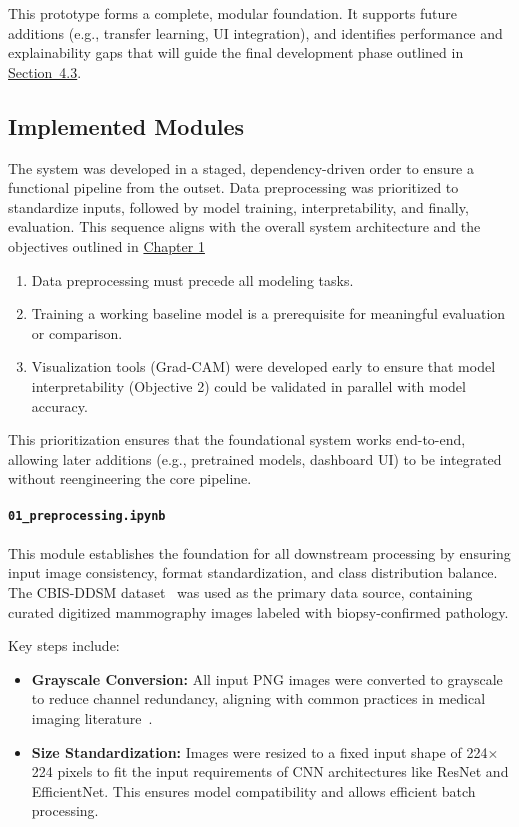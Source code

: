 \documentclass[12pt]{article}
\begin{document}
This prototype forms a complete, modular foundation. It supports future additions (e.g., transfer learning, UI integration), and identifies performance and explainability gaps that will guide the final development phase outlined in \hyperref[improvements]{Section~4.3}.

\subsection{Implemented Modules}
The system was developed in a staged, dependency-driven order to ensure a functional pipeline from the outset. Data preprocessing was prioritized to standardize inputs, followed by model training, interpretability, and finally, evaluation. This sequence aligns with the overall system architecture and the objectives outlined in \hyperref[chapter1]{Chapter 1}

\begin{enumerate}
    \item Data preprocessing must precede all modeling tasks.
    \item Training a working baseline model is a prerequisite for meaningful evaluation or comparison.
    \item Visualization tools (Grad-CAM) were developed early to ensure that model interpretability (Objective 2) could be validated in parallel with model accuracy.
\end{enumerate}

This prioritization ensures that the foundational system works end-to-end, allowing later additions (e.g., pretrained models, dashboard UI) to be integrated without reengineering the core pipeline.


\paragraph{\texttt{01\_preprocessing.ipynb}}
This module establishes the foundation for all downstream processing by ensuring input image consistency, format standardization, and class distribution balance. The CBIS-DDSM dataset~\cite{18} was used as the primary data source, containing curated digitized mammography images labeled with biopsy-confirmed pathology.

Key steps include:
\begin{itemize}
    \item \textbf{Grayscale Conversion:} All input PNG images were converted to grayscale to reduce channel redundancy, aligning with common practices in medical imaging literature~\cite{7}.
    \item \textbf{Size Standardization:} Images were resized to a fixed input shape of 224$\times$224 pixels to fit the input requirements of CNN architectures like ResNet and EfficientNet. This ensures model compatibility and allows efficient batch processing.
\end{itemize}
\end{document}
